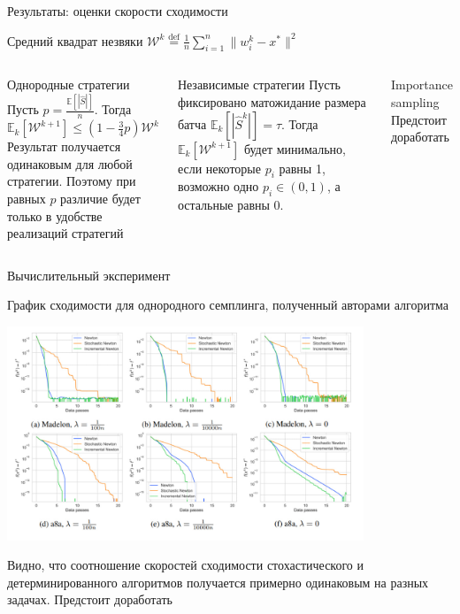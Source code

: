 \documentclass{beamer}
\begin{document}
\begin{frame}{Результаты: оценки скорости сходимости}
	
	\begin{block}{Средний квадрат незвяки}
		$\mathcal W^k \overset{\text{def}} = \frac{1}{n} \sum \limits_{i=1}^n \| w_i^k - x^* \|^2$
	\end{block}
	
\begin{columns}[c]
	\begin{block}{Однородные стратегии}
		Пусть $p = \frac{\mathbb E[|\hat S|]}{n}$. Тогда \\
		$ \mathbb E_k[\mathcal W^{k+1}] \leqslant \left( 1 - \frac{3}{4}p \right) \mathcal W^k$ \\
		Результат получается одинаковым для любой стратегии. Поэтому при равных $p$ различие будет только в удобстве реализаций стратегий
	\end{block}
	\begin{block}{Независимые стратегии}
		Пусть фиксировано матожидание размера батча $\mathbb E_k[|\hat S^k|] = \tau$. Тогда	$ \mathbb E_k[\mathcal W^{k+1}] $ будет минимально, если некоторые $p_i$ равны 1, возможно одно $p_i \in(0,1)$, а остальные равны $0$.
	\end{block}

	\begin{block}{Importance sampling}
		{\color{red} Предстоит доработать}
	\end{block}

\end{columns}
	
\end{frame}
\begin{frame}{Вычислительный эксперимент}

 График сходимости для однородного семплинга, полученный авторами алгоритма

\includegraphics[width=0.8\textwidth]{baseline_graphs.jpg}

Видно, что соотношение скоростей сходимости стохастического и детерминированного алгоритмов получается примерно одинаковым на разных задачах. {\color{red} Предстоит доработать}

\end{frame}
\end{document}
